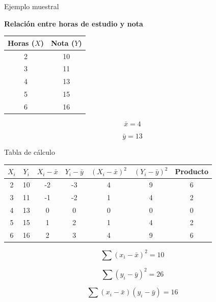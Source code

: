 \documentclass{beamer}
\begin{document}
\begin{frame}{Ejemplo muestral}

\textbf{Relación entre horas de estudio y nota}

\vspace{0.3cm}

\begin{center}
\begin{tabular}{cc}
\toprule
Horas (\(X\)) & Nota (\(Y\)) \\
\midrule
2 & 10 \\
3 & 11 \\
4 & 13 \\
5 & 15 \\
6 & 16 \\
\bottomrule
\end{tabular}
\end{center}

\vspace{0.3cm}

\[
\bar{x}=4
\]

\[
\bar{y}=13
\]

\end{frame}

\begin{frame}{Tabla de cálculo}

\small

\begin{center}
\begin{tabular}{ccccccc}
\toprule

\(X_i\) &
\(Y_i\) &
\(X_i-\bar{x}\) &
\(Y_i-\bar{y}\) &
\((X_i-\bar{x})^2\) &
\((Y_i-\bar{y})^2\) &
Producto \\

\midrule

2 & 10 & -2 & -3 & 4 & 9 & 6 \\
3 & 11 & -1 & -2 & 1 & 4 & 2 \\
4 & 13 & 0 & 0 & 0 & 0 & 0 \\
5 & 15 & 1 & 2 & 1 & 4 & 2 \\
6 & 16 & 2 & 3 & 4 & 9 & 6 \\

\bottomrule
\end{tabular}
\end{center}

\vspace{0.3cm}

\[
\sum (x_i-\bar{x})^2 = 10
\]

\[
\sum (y_i-\bar{y})^2 = 26
\]

\[
\sum (x_i-\bar{x})(y_i-\bar{y}) = 16
\]

\end{frame}
\end{document}
